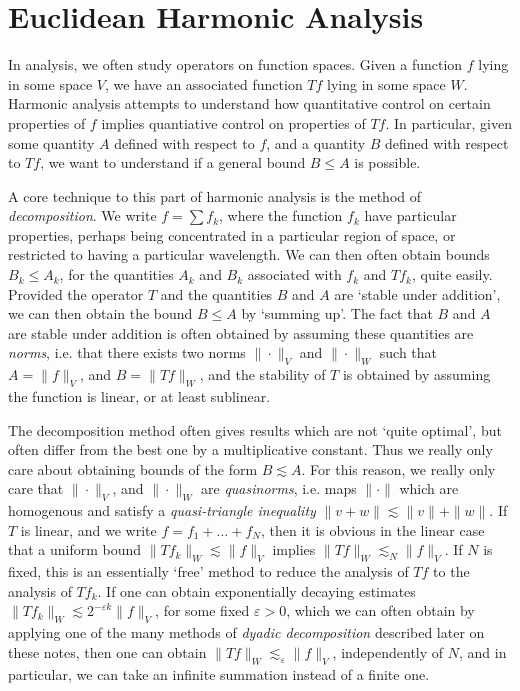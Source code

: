 



\part{Euclidean Harmonic Analysis}

In analysis, we often study operators on function spaces. Given a function $f$ lying in some space $V$, we have an associated function $Tf$ lying in some space $W$. Harmonic analysis attempts to understand how quantitative control on certain properties of $f$ implies quantiative control on properties of $Tf$. In particular, given some quantity $A$ defined with respect to $f$, and a quantity $B$ defined with respect to $Tf$, we want to understand if a general bound $B \leq A$ is possible.

A core technique to this part of harmonic analysis is the method of \emph{decomposition}. We write $f = \sum f_k$, where the function $f_k$ have particular properties, perhaps being concentrated in a particular region of space, or restricted to having a particular wavelength. We can then often obtain bounds $B_k \leq A_k$, for the quantities $A_k$ and $B_k$ associated with $f_k$ and $Tf_k$, quite easily. Provided the operator $T$ and the quantities $B$ and $A$ are `stable under addition', we can then obtain the bound $B \leq A$ by `summing up'. The fact that $B$ and $A$ are stable under addition is often obtained by assuming these quantities are \emph{norms}, i.e. that there exists two norms $\| \cdot \|_V$ and $\| \cdot \|_W$ such that $A = \| f \|_V$, and $B = \| Tf \|_W$, and the stability of $T$ is obtained by assuming the function is linear, or at least sublinear.

The decomposition method often gives results which are not `quite optimal', but often differ from the best one by a multiplicative constant. Thus we really only care about obtaining bounds of the form $B \lesssim A$. For this reason, we really only care that $\| \cdot \|_V$, and $\| \cdot \|_W$ are \emph{quasinorms}, i.e. maps $\| \cdot \|$ which are homogenous and satisfy a \emph{quasi-triangle inequality} $\| v + w \| \lesssim \| v \| + \| w \|$. If $T$ is linear, and we write $f = f_1 + \dots + f_N$, then it is obvious in the linear case that a uniform bound $\| Tf_k \|_W \lesssim \| f \|_V$ implies $\| Tf \|_W \lesssim_N \| f \|_V$. If $N$ is fixed, this is an essentially `free' method to reduce the analysis of $Tf$ to the analysis of $Tf_k$. If one can obtain exponentially decaying estimates $\| Tf_k \|_W \lesssim 2^{-\varepsilon k} \| f \|_V$, for some fixed $\varepsilon > 0$, which we can often obtain by applying one of the many methods of \emph{dyadic decomposition} described later on these notes, then one can obtain $\| Tf \|_W \lesssim_\varepsilon \| f \|_V$, independently of $N$, and in particular, we can take an infinite summation instead of a finite one.

